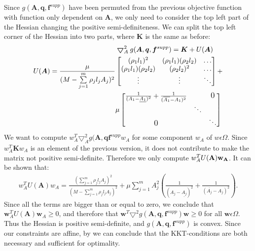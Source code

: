 Since $g(\bm{A},\bm{q},\bm{f}^{supp})$ have been permuted from the previous objective function with function only dependent on $\bm{A}$, we only need to consider the top left part of the Hessian changing the positive semi-definiteness. We can split the top left corner of the Hessian into two parts, where $\bm{K}$ is the same as before:
\begin{align*}
& \bm{\bigtriangledown}_{A}^2 g(\bm{A},\bm{q},\bm{f}^{supp}) = \bm{K} + U(\bm{A}) \\
U(\bm{A}) = \frac{\mu}{(M-\sum\limits_{j=1}^{m}\rho_jl_jA_j)^2} &
\begin{bmatrix}
(\rho_1l_1)^2 & (\rho_1l_1)(\rho_2l_2) & \hdots \\
(\rho_1l_1)(\rho_2l_2) & (\rho_2l_2)^ 2 & \hdots \\
\vdots & \vdots & \ddots \\
\end{bmatrix} + \\
& \mu 
\begin{bmatrix}
\frac{1}{(A_1-\underline{A_{1}})^2} + \frac{1}{(\overline{A_{1}}-A_{1})^2} &  & \text{\large{0}} \\
  & \ddots &  \\
\text{\large0} &  & \ddots \\
\end{bmatrix}
\end{align*}
We want to compute $w_{A}^T\bm{\bigtriangledown}_{A}^2g(\bm{A},\bm{q}\bm{f}^{supp}w_A$ for some component $w_A$ of $w\epsilon\Omega$. Since $w_A^T\bm{K}w_A$ is an element of the previous version, it does not contribute to make the matrix not positive semi-definite. Therefore we only compute $w_A^TU(\bf{A})w_A$. It can be shown that:
\begin{align*}
w_A^TU(\bm{A})w_A = \frac{(\sum\limits_{j=1}^m\rho_jl_jA_j)^2}{(M-\sum\limits_{j=1}^m\rho_jl_jA_j)^2} + \mu\sum\limits_{j=1}^mA_j^2(\frac{1}{(A_j-\underline{A_{j}})^2} + \frac{1}{(\overline{A_{j}}-A_{j})^2}).
\end{align*}
Since all the terms are bigger than or equal to zero, we conclude that \\ $\bm{w}_A^TU(\bm{A})\bm{w}_A \geq 0$, and therefore that $\bm{w}^T\bm{\bigtriangledown}^2 g(\bm{A},\bm{q},\bm{f}^{supp})\bm{w} \geq 0$ for all $\bm{w}\epsilon\Omega$. Thus the Hessian is positive semi-definite, and  $g(\bm{A},\bm{q},\bm{f}^{supp})$ is convex. Since our constraints are affine, by \cite{KKT_suff} we can conclude that the KKT-conditions are both necessary and sufficient for optimality.


